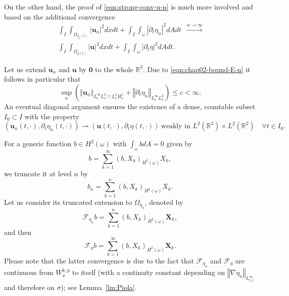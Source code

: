 \documentclass[10pt,a4paper]{article}
\numberwithin{equation}{section}
\begin{document}
On the other hand, the proof of \eqref{eqn:strong-conv-u-n} is much more involved and based on the additional convergence 
\begin{equation}\label{eqn:convergence-L2-norms}
\begin{aligned}\int_{I}\int_{\Omega_{\eta_{n}\left(t\right)}}\left|\mathbf{u}_{n}\right|^{2}dxdt+\int_{I}\int_{\omega}\left|\partial_{t}\eta_{n}\right|^{2}dAdt & \xrightarrow{n\to\infty}\\
\int_{I}\int_{\Omega_{\eta \left(t\right)}}\left|\mathbf{u}\right|^{2}dxdt+\int_{I}\int_{\omega}\left|\partial_{t}\eta\right|^{2}dAdt.
\end{aligned}
\end{equation}


Let us extend $\mathbf{u}_n$ and $\mathbf{u}$ by $\mathbf{0}$ to the whole $\mathbb{R}^{3}$.
Due to \eqref{eqn:chap02-bound-E-n} it follows in particular that 
\begin{equation}
\sup_{n}\left(\left\Vert \mathbf{u}_{n}\right\Vert _{L_{t}^{\infty}L_{x}^{2}\cap L_{t}^{2}H_{x}^{1}}+\left\Vert \partial_{t}\eta_{n}\right\Vert _{L_{t}^{\infty}L_{x}^{2}}\right)\le c<\infty.
\end{equation}
An eventual diagonal argument ensures the existence of a dense, countable subset $I_0 \subset I$ with the property
\begin{equation}
\left(\mathbf{u}_{n}\left(t,\cdot\right),\partial_{t}\eta_{n}\left(t,\cdot\right)\right)\rightharpoonup\left(\mathbf{u}\left(t,\cdot\right),\partial_{t}\eta\left(t,\cdot\right)\right)\ \text{weakly in }L^{2}\left(\mathbb{R}^{3}\right)\times L^{2}\left(\mathbb{\mathbb{R}}^{2}\right)\quad\forall t\in I_{0}.
\end{equation}

For a generic function $b\in H^{2}(\omega)$ with $\int _{\omega} bdA=0$ given by 
\[
b=\sum_{k=1}^{\infty}\left(b,X_{k}\right)_{H^{2}\left(\omega\right)}X_{k},
\]
we truncate it at level $n$ by
\[
b_n=\sum_{k=1}^{n}\left(b,X_{k}\right)_{H^{2}\left(\omega\right)}X_{k}.
\]
Let us consider its truncated extension to $\Omega_{\eta_n}$, denoted by
\[
\mathcal{F}_{\eta_{n}}b=\sum_{k=1}^{n}\left(b,X_{k}\right)_{H^{2}\left(\omega\right)}\mathbf{X}_{k},
\]
and then
\[
\mathcal{F}_{\eta}b=\sum_{k=1}^{\infty}\left(b,X_{k}\right)_{H^{2}\left(\omega\right)}\mathbf{X}_{k}.
\]
Please note that the latter convergence is due to the fact that $\mathcal{F}_{\eta_n}$ and $\mathcal{F}_{\eta}$ are continuous from $W_{x}^{k,p}$ to itself (with a continuity constant depending on $\left\Vert \nabla\eta_{n}\right\Vert _{L_{t,x}^{\infty}}$ and therefore on $\sigma$); see Lemma~\ref{lm:Piola}.
\end{document}
